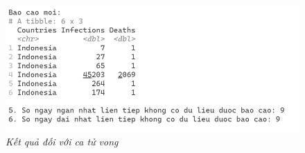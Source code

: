 \documentclass[a4paper]{article}
\theoremstyle{definition}
\begin{document}
\begin{figure}[H]
    \begin{center}
            \includegraphics[scale=0.6]{iii/idn_3.png}
    \end{center}
    \caption{\it Kết quả đối với ca tử vong}
\end{figure}
\end{document}

